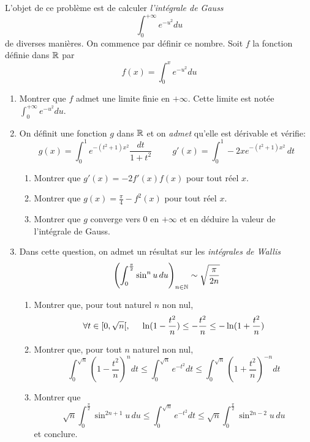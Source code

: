 L'objet de ce problème est de calculer \emph{l'intégrale de Gauss}
\begin{displaymath}
 \int_{0}^{+\infty}e^{-u^2}du
\end{displaymath}
de diverses manières. On commence par définir ce nombre.\newline
Soit $f$ la fonction définie dans $\mathbb{R}$ par
\begin{displaymath}
 f(x)=\int_0^x e^{-u^2}du
\end{displaymath}
\begin{enumerate}
 \item Montrer que $f$ admet une limite finie en $+\infty$. Cette limite est notée $\int_{0}^{+\infty}e^{-u^2}du$.
 \item On définit une fonction $g$ dans $\mathbb{R}$ et on \emph{admet} qu'elle est dérivable et vérifie:
\begin{displaymath}
 g(x)=\int_0^1 e^{-(t^2+1)x^2}\frac{dt}{1+t^2}\hspace{1cm}
g'(x)=\int_0^1 -2xe^{-(t^2+1)x^2}\, dt
\end{displaymath}
\begin{enumerate}
 \item Montrer que $g'(x) = -2f'(x)f(x)$ pour tout réel $x$.
 \item Montrer que $g(x)=\frac{\pi}{4}-f^2(x)$ pour tout réel $x$.
 \item Montrer que $g$ converge vers $0$ en $+\infty$ et en déduire la valeur de l'intégrale de Gauss. 
\end{enumerate}
\item Dans cette question, on admet un résultat sur les \emph{intégrales de Wallis}
\begin{displaymath}
 \left( \int_0^{\frac{\pi}{2}}\sin^{n}u\,du \right) _{n\in \mathbb{N}}\sim \sqrt{\frac{\pi}{2n}}
\end{displaymath}
\begin{enumerate}
 \item Montrer que, pour tout naturel $n$ non nul,
\begin{displaymath}
 \forall t\in [0, \sqrt{n}[,\hspace{0.5cm} \ln(1-\frac{t^2}{n})\leq -\frac{t^2}{n}\leq 
-\ln(1+\frac{t^2}{n})
\end{displaymath}
 \item Montrer que, pour tout $n$ naturel non nul, 
\begin{displaymath}
 \int_0^{\sqrt{n}}(1-\frac{t^2}{n})^ndt \leq
\int_0^{\sqrt{n}}e^{-t^2}dt \leq 
 \int_0^{\sqrt{n}}(1+\frac{t^2}{n})^{-n}dt 
\end{displaymath}
\item Montrer que
\begin{displaymath}
 \sqrt{n}\int_0^{\frac{\pi}{2}}\sin^{2n+1}u\,du
\leq \int_0^{\sqrt{n}}e^{-t^2}dt\leq 
 \sqrt{n}\int_0^{\frac{\pi}{2}}\sin^{2n-2}u\,du
\end{displaymath}
et conclure.
\end{enumerate}


\end{enumerate}
